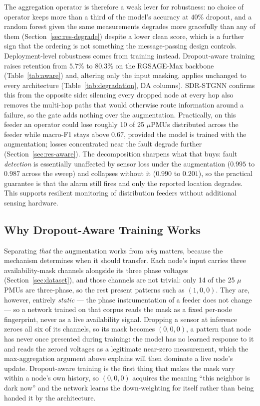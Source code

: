 \documentclass[3p,times,procedia]{elsarticle}
\begin{document}
The aggregation operator is therefore a weak lever for robustness: no choice of operator keeps more than a third of the model's accuracy at $40\%$ dropout, and a random forest given the same measurements degrades more gracefully than any of them (Section~\ref{sec:res-degrade}) despite a lower clean score, which is a further sign that the ordering is not something the message-passing design controls. Deployment-level robustness comes from training instead. Dropout-aware training raises retention from $5.7\%$ to $80.3\%$ on the RGSAGE-Max backbone (Table~\ref{tab:aware}) and, altering only the input masking, applies unchanged to every architecture (Table~\ref{tab:degradation}, DA columns). SDR-STGNN confirms this from the opposite side: silencing every dropped node at every hop also removes the multi-hop paths that would otherwise route information around a failure, so the gate adds nothing over the augmentation. Practically, on this feeder an operator could lose roughly 10 of 25 $\mu$PMUs distributed across the feeder while macro-F1 stays above $0.67$, provided the model is trained with the augmentation; losses concentrated near the fault degrade further (Section~\ref{sec:res-aware}). The decomposition sharpens what that buys: fault \emph{detection} is essentially unaffected by sensor loss under the augmentation ($0.995$ to $0.987$ across the sweep) and collapses without it ($0.990$ to $0.201$), so the practical guarantee is that the alarm still fires and only the reported location degrades. This supports resilient monitoring of distribution feeders without additional sensing hardware.

\subsection{Why Dropout-Aware Training Works}
\label{sec:disc-mechanism}

Separating \emph{that} the augmentation works from \emph{why} matters, because the mechanism determines when it should transfer. Each node's input carries three availability-mask channels alongside its three phase voltages (Section~\ref{sec:dataset}), and those channels are not trivial: only 14 of the 25 $\mu$PMUs are three-phase, so the rest present patterns such as $(1,0,0)$. They are, however, entirely \emph{static} --- the phase instrumentation of a feeder does not change --- so a network trained on that corpus reads the mask as a fixed per-node fingerprint, never as a live availability signal. Dropping a sensor at inference zeroes all six of its channels, so its mask becomes $(0,0,0)$, a pattern that node has never once presented during training: the model has no learned response to it and reads the zeroed voltages as a legitimate near-zero measurement, which the max-aggregation argument above explains will then dominate a live node's update. Dropout-aware training is the first thing that makes the mask vary within a node's own history, so $(0,0,0)$ acquires the meaning ``this neighbor is dark now'' and the network learns the down-weighting for itself rather than being handed it by the architecture.
\end{document}
